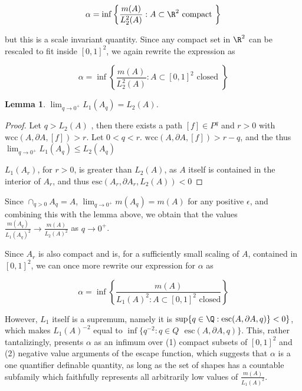 \documentclass{journal}
\newtheorem{lem}[thm]{Lemma}          %
\theoremstyle{definition}
\begin{document}
$$\alpha = \inf\left\{ \frac{m(A)}{L_2^2(A)}:A\subset \R^2 \text{ compact } \right\}$$

but this is a scale invariant quantity. Since any compact set in $\R^2$ can be rescaled to fit inside $[0,1]^2$, we again rewrite the expression as

$$\alpha = \inf\left\{ \frac{m(A)}{L_2^2(A)}:A\subset [0,1]^2 \text{ closed } \right\}$$

\begin{lem}
    $\lim_{q \rightarrow 0^+} L_1(A_q) = L_2(A)$.
\end{lem}
\label{lem:onetwoeq}

\begin{proof}
    Let $q > L_2(A)$ , then there exists a path $[f]\in P^q$ and $r > 0$ with $\mathrm{wcc}(A,\partial A, [f]) > r$. Let $0< q < r$. $\mathrm{wcc}(A,\partial A, [f]) > r-q$, and the thus $\lim_{q\rightarrow 0^+} L_1(A_q)\leq L_2(A_q)$

    $L_1(A_r)$, for $r > 0$, is greater than $L_2(A)$, as $A$ itself is contained in the interior of $A_r$, and thus $\mathrm{esc}(A_r,\partial A_r, L_2(A)) < 0 $
\end{proof}

Since $\cap _{q > 0}A_q = A$, $\lim_{q\rightarrow 0^+} m(A_q) = m(A) $ for any positive $\epsilon$, and combining this with the lemma above, we obtain that the values $\frac{m(A_q)}{L_1(A_q)^2} \rightarrow \frac{m(A)}{L_2(A)^2}$ as $q \rightarrow 0^+$.

Since $A_r$ is also compact and is, for a sufficiently small scaling of $A$, contained in $[0,1]^2$, we can once more rewrite our expression for $\alpha $ as


$$\alpha = \inf\left\{\frac{m(A)}{L_1(A)^2: A\subset [0,1]^2 \text{ closed}}\right\}$$

However, $L_1$ itself is a supremum, namely it is $\sup\{q\in\Q: \mathrm{esc}(A,\partial A, q)\}< 0\}$, which makes $L_1(A)^{-2}$ equal to $\inf\{q^{-2}: q\in Q \text{ } \mathrm{esc}(A,\partial A, q)\}$. This, rather tantalizingly, presents $\alpha$ as an infimum over (1) compact subsets of $[0,1]^2$ and (2) negative value arguments of the escape function, which suggests that $\alpha$ is a one quantifier definable quantity, as long as the set of shapes has a countable subfamily which faithfully represents all arbitrarily low values of $\frac{m(A)}{L_1(A)^2}$.
\end{document}
